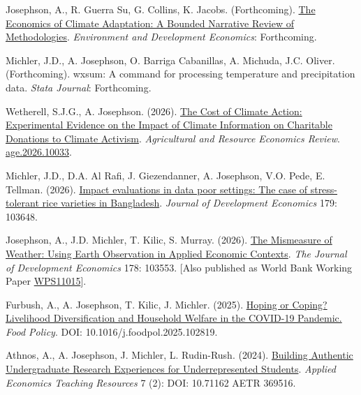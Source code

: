 \documentclass[letterpaper]{article}
\begin{document}
 \renewcommand{\labelenumi}{[\theenumi]}
   \begin{etaremune}

   \item Josephson, A., R. Guerra Su, G. Collins, K. Jacobs. (Forthcoming). \href{https://arxiv.org/abs/2411.16893}{The Economics of Climate Adaptation: A Bounded Narrative Review of Methodologies}. \emph{Environment and Development Economics}: Forthcoming.

\item Michler, J.D., A. Josephson, O. Barriga Cabanillas, A. Michuda, J.C. Oliver. (Forthcoming). wxsum: A command for processing temperature and precipitation data. \emph{Stata Journal}: Forthcoming.

    \item Wetherell, S.J.G., A. Josephson. (2026). \href{https://arxiv.org/abs/2409.17378}{The Cost of Climate Action: Experimental Evidence on the Impact of Climate Information on Charitable Donations to Climate Activism}. \emph{Agricultural and Resource Economics Review}. \href{https://doi.org/10.1017/age.2026.10033}{ age.2026.10033}.

   \item Michler, J.D., D.A. Al Rafi, J. Giezendanner, A. Josephson, V.O. Pede, E. Tellman. (2026). \href{https://www.sciencedirect.com/science/article/abs/pii/S0304387825001993}{Impact evaluations in data poor settings: The case of stress-tolerant rice varieties in Bangladesh}. \emph{Journal of Development Economics} 179: 103648.  

   \item Josephson, A., J.D. Michler, T. Kilic, S. Murray. (2026). \href{https://www.sciencedirect.com/science/article/abs/pii/S030438782500104X}{The Mismeasure of Weather: Using Earth Observation in Applied Economic Contexts}. \emph{The Journal of Development Economics} 178: 103553. [Also published as World Bank Working Paper \href{https://documents.worldbank.org/en/publication/documents-reports/documentdetail/099850401072516334}{WPS11015}]. 

   \item  Furbush, A., A. Josephson, T. Kilic, J. Michler. (2025). \href{https://www.sciencedirect.com/science/article/abs/pii/S0306919225000235}{Hoping or Coping? Livelihood Diversification and Household Welfare in the COVID-19 Pandemic.} \emph{Food Policy}. DOI: 10.1016/j.foodpol.2025.102819. 
   
\item Athnos, A., A. Josephson, J. Michler, L. Rudin-Rush. (2024). \href{https://doi.org/10.71162/aetr.369516}{Building Authentic Undergraduate Research Experiences for Underrepresented Students}. \emph{Applied Economics Teaching Resources} 7 (2): DOI: 10.71162 AETR 369516.  	
   	

\end{etaremune}
\end{document}
